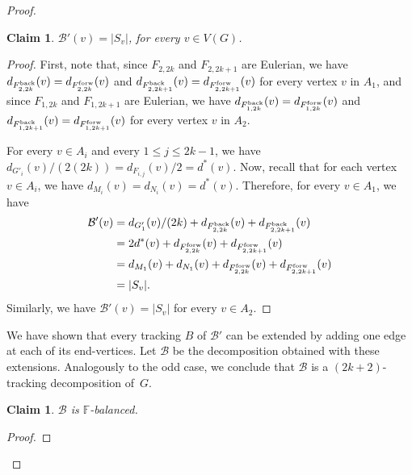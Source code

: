 \documentclass[12pt,reqno,a4paper]{amsart}
\newtheorem{claim}[theorem]{Claim}
\def\back{\mathop{\text{\rm back}}\nolimits}
\def\forw{\mathop{\text{\rm forw}}\nolimits}
\newcommand{\B}{\mathcal{B}}
\begin{document}
\begin{proof}
\begin{claim}
	 \(\B'(v) = |S_v|\), for every $v\in V(G)$.
\end{claim}

\begin{proof}
First, note that, since \(F_{2,2k}\) and \(F_{2,2k+1}\) are Eulerian, 
we have \(d_{F_{2,2k}^{\back}}(v) = d_{F_{2,2k}^{\forw}}(v)\) 
and \(d_{F_{2,2k+1}^{\back}}(v) = d_{F_{2,2k+1}^{\forw}}(v)\)
for every vertex \(v\) in \(A_1\),
and since \(F_{1,2k}\) and \(F_{1,2k+1}\) are Eulerian, we have 
\(d_{F_{1,2k}^{\back}}(v) = d_{F_{1,2k}^{\forw}}(v)\) and 
\(d_{F_{1,2k+1}^{\back}}(v) = d_{F_{1,2k+1}^{\forw}}(v)\)
for every vertex \(v\) in \(A_2\).

For every \(v\in A_i\) and every \(1\leq j\leq 2k-1\), 
we have \(d_{G'_i}(v)/(2(2k)) = d_{F_{i,j}}(v)/2 = d^*(v)\).
Now, recall that for each vertex \(v\in A_i\), we have \(d_{M_i}(v) = 
d_{N_i}(v) = d^*(v)\).
Therefore, for every $v\in A_1$, we have 
\begin{align*}
	 \B'(v) & = d_{G'_1}(v)/(2k) + d_{F_{2,2k}^{\back}}(v) + 
d_{F_{2,2k+1}^{\back}}(v) \\
			& = 2d^*(v) + d_{F_{2,2k}^{\forw}}(v) + 
d_{F_{2,2k+1}^{\forw}}(v)\\
			& = d_{M_1}(v) + d_{N_1}(v) + d_{F_{2,2k}^{\forw}}(v) + 
d_{F_{2,2k+1}^{\forw}}(v)\\
			& = |S_v|.
\end{align*}
Similarly, we have $\B'(v)=|S_v|$ for every $v\in A_2$.
\end{proof}

We have shown that every tracking \(B\) of 
\(\B'\) can be extended by adding one edge at each of its end-vertices.
Let \(\B\) be the decomposition obtained with these extensions.
Analogously to the odd case, we conclude that \(\B\) is a \((2k+2)\)-tracking decomposition of~\(G\).

\begin{claim}
\(\B\) is \(\mathbb{F}\)-balanced.
\end{claim}

\begin{proof}


\end{proof}
\end{proof}
\end{document}

